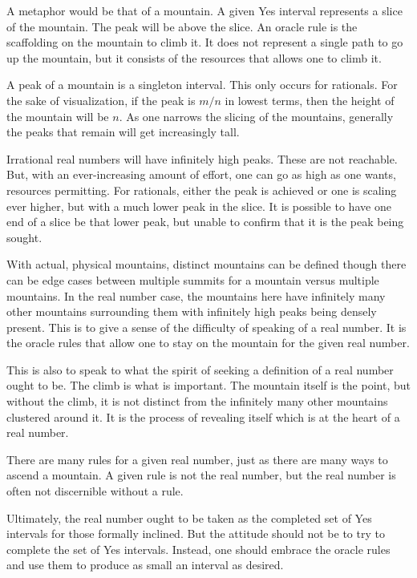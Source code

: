 \documentclass[12pt]{article}
\begin{document}
A metaphor would be that of a mountain. A given Yes interval represents a slice of the mountain. The peak will be above the slice. An oracle rule is the scaffolding on the mountain to climb it. It does not represent a single path to go up the mountain, but it consists of the resources that allows one to climb it. 

A peak of a mountain is a singleton interval. This only occurs for rationals. For the sake of visualization, if the peak is $m/n$ in lowest terms, then the height of the mountain will be $n$. As one narrows the slicing of the mountains, generally the peaks that remain will get increasingly tall. 

Irrational real numbers will have infinitely high peaks. These are not reachable. But, with an ever-increasing amount of effort, one can go as high as one wants, resources permitting. For rationals, either the peak is achieved or one is scaling ever higher, but with a much lower peak in the slice. It is possible to have one end of a slice be that lower peak, but unable to confirm that it is the peak being sought. 

With actual, physical mountains, distinct mountains can be defined though there can be edge cases between multiple summits for a mountain versus multiple mountains. In the real number case, the mountains here have infinitely many other mountains surrounding them with infinitely high peaks being densely present. This is to give a sense of the difficulty of speaking of a real number. It is the oracle rules that allow one to stay on the mountain for the given real number. 

This is also to speak to what the spirit of seeking a definition of a real number ought to be. The climb is what is important. The mountain itself is the point, but without the climb, it is not distinct from the infinitely many other mountains clustered around it. It is the process of revealing itself which is at the heart of a real number. 

There are many rules for a given real number, just as there are many ways to ascend a mountain. A given rule is not the real number, but the real number is often not discernible without a rule. 

Ultimately, the real number ought to be taken as the completed set of Yes intervals for those formally inclined. But the attitude should not be to try to complete the set of Yes intervals. Instead, one should embrace the oracle rules and use them to produce as small an interval as desired. 
\end{document}
